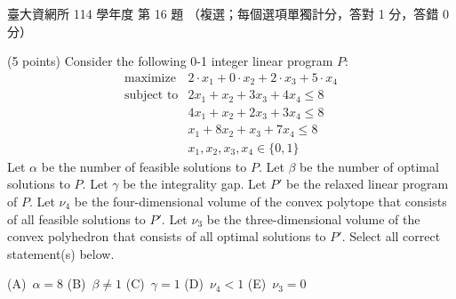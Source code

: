 \begin{pastexam}[label={px:ntu-114-dsa-16}]{臺大資網所 114 學年度 第 16 題}
（複選；每個選項單獨計分，答對 1 分，答錯 0 分）

(5 points) Consider the following 0-1 integer linear program $P$:
\[\begin{array}{ll}
\text{maximize} & 2\cdot x_1+0\cdot x_2+2\cdot x_3+5\cdot x_4\\
\text{subject to} & 2x_1+x_2+3x_3+4x_4\le 8\\
 & 4x_1+x_2+2x_3+3x_4\le 8\\
 & x_1+8x_2+x_3+7x_4\le 8\\
 & x_1,x_2,x_3,x_4\in\{0,1\}
\end{array}\]
Let $\alpha$ be the number of feasible solutions to $P$. Let $\beta$ be the number of optimal solutions to $P$. Let
$\gamma$ be the integrality gap. Let $P'$ be the relaxed linear program of $P$. Let $\nu_4$ be the
four-dimensional volume of the convex polytope that consists of all feasible solutions to $P'$. Let $\nu_3$ be the
three-dimensional volume of the convex polyhedron that consists of all optimal solutions to $P'$. Select all
correct statement(s) below.

(A)~$\alpha=8$ \hfill (B)~$\beta\neq1$ \hfill (C)~$\gamma=1$ \hfill (D)~$\nu_4<1$ \hfill (E)~$\nu_3=0$
\end{pastexam}

